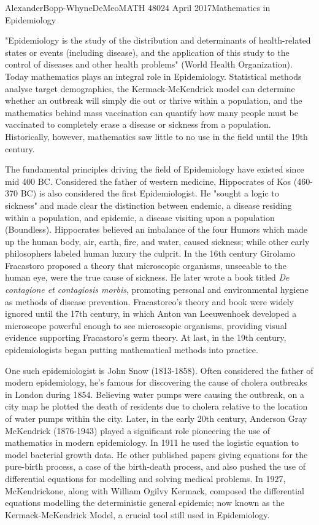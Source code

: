 \documentclass[12pt, letterpaper]{article}
\begin{document}
\begin{mla}{Alexander}{Bopp-Whyne}{DeMeo}{MATH 480}{24 April 2017}{Mathematics in Epidemiology}

"Epidemiology is the study of the distribution and determinants of health-related states or events (including disease), and the application of this study to the control of diseases and other health problems" (World Health Organization). Today mathematics plays an integral role in Epidemiology. Statistical methods analyse target demographics, the Kermack-McKendrick model can determine whether an outbreak will simply die out or thrive within a population, and the mathematics behind mass vaccination can quantify how many people must be vaccinated to completely erase a disease or sickness from a population. Historically, however, mathematics saw little to no use in the field until the 19th century. 

The fundamental principles driving the field of Epidemiology have existed since mid 400 BC. Considered the father of western medicine, Hippocrates of Kos (460-370 BC) is also considered the first Epidemiologist. He "sought a logic to sickness" and made clear the distinction between endemic, a disease residing within a population, and epidemic, a disease visiting upon a population (Boundless). Hippocrates believed an imbalance of the four Humors which made up the human body, air, earth, fire, and water, caused sickness; while other early philosophers labeled human luxury the culprit. In the 16th century Girolamo Fracastoro proposed a theory that microscopic organisms, unseeable to the human eye, were the true cause of sickness. He later wrote a book titled \textit{De contagione et contagiosis morbis}, promoting personal and environmental hygiene as methods of disease prevention. Fracastoreo's theory and book were widely ignored until the 17th century, in which Anton van Leeuwenhoek developed a microscope powerful enough to see microscopic organisms, providing visual evidence supporting Fracastoro's germ theory. At last, in the 19th century, epidemiologists began putting mathematical methods into practice. 

One such epidemiologist is John Snow (1813-1858). Often considered the father of modern epidemiology, he's famous for discovering the cause of cholera outbreaks in London during 1854. Believing water pumps were causing the outbreak, on a city map he plotted the death of residents due to cholera relative to the location of water pumps within the city. Later, in the early 20th century, Anderson Gray McKendrick (1876-1943) played a significant role pioneering the use of mathematics in modern epidemiology. In 1911 he used the logistic equation to model bacterial growth data. He other published papers giving equations for the pure-birth process, a case of the birth-death process, and also pushed the use of differential equations for modelling and solving medical problems. In 1927, McKendrickone, along with William Ogilvy Kermack, composed the differential equations modelling the deterministic general epidemic; now known as the Kermack-McKendrick Model, a crucial tool still used in Epidemiology.


\end{mla}
\end{document}
